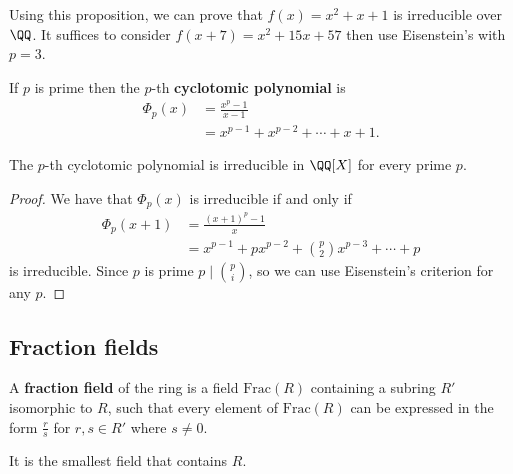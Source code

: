 \documentclass[12pt, a4paper]{article}
\begin{document}
\begin{mdexample}
    Using this proposition, we can prove that \(f(x)=x^2+x+1\) is irreducible over \(\QQ\). It suffices to consider \(f(x+7)=x^2+15x+57\) then use Eisenstein's with \(p=3\).
\end{mdexample}

\begin{definition}
    If \(p\) is prime then the \(p\)-th \textbf{cyclotomic polynomial} is 
    \[\begin{aligned}
        \Phi_p(x) &= \frac{x^p-1}{x-1} \\
        &=x^{p-1}+x^{p-2}+\cdots +x+1.
    \end{aligned}\]
\end{definition}

\begin{mdprop}
    The \(p\)-th cyclotomic polynomial is irreducible in \(\QQ[X]\) for every prime \(p\).
\end{mdprop}

\begin{proof}
    We have that \(\Phi_p(x)\) is irreducible if and only if 
    \[\begin{aligned}
        \Phi_p(x+1) &= \frac{(x+1)^p-1}{x} \\
        &= x^{p-1}+px^{p-2} +\binom{p}{2} x^{p-3}+ \cdots +p
    \end{aligned}\]
    is irreducible. Since \(p\) is prime \(p \mid \binom{p}{i}\), so we can use Eisenstein's criterion for any \(p\).
\end{proof}

\subsection{Fraction fields}

\begin{definition}
    A \textbf{fraction field} of the ring is a field \(\text{Frac}(R)\) containing a subring \(R'\) isomorphic to \(R\), such that every element of \(\text{Frac}(R)\) can be expressed in the form \(\frac{r}{s}\) for \(r,s\in R'\) where \(s\neq 0\).
\end{definition}

\begin{mdnote}
    It is the smallest field that contains \(R\).
\end{mdnote}
\end{document}
